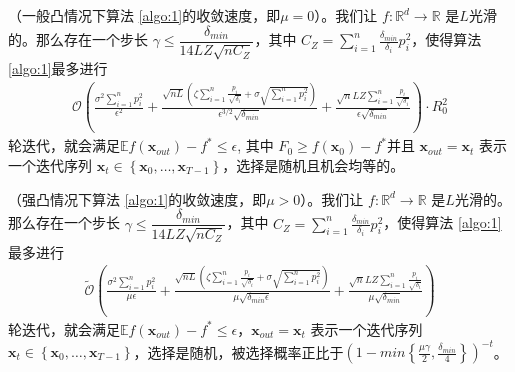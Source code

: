 \begin{theorem}

（一般凸情况下算法 \ref{algo:1}的收敛速度，即$\mu = 0$）。我们让 $f: \mathbb{R}^d \rightarrow \mathbb{R}$ 是$L$光滑的。那么存在一个步长 $\gamma \leq \dfrac{\delta_{min}}{14LZ\sqrt{n C_Z}}$，其中 $C_Z = \sum_{i=1}^n\frac{\delta_{min}}{\delta_i}p_i^2$，使得算法 \ref{algo:1}最多进行
\begin{equation}
\begin{split}
    \mathcal{O}(\frac{\sigma^2\sum_{i=1}^n p_i^2}{\epsilon^2}+\frac{\sqrt{n L}(\zeta\sum_{i=1}^n\frac{p_i}{\sqrt{\delta_i}}+\sigma\sqrt{\sum_{i=1}^n p_i^2})}{\epsilon^{3/2}\sqrt{\delta_{min}} }
    +\frac{\sqrt{n} L Z\sum_{i=1}^n\frac{p_i}{\sqrt{\delta_i}}}{\epsilon\sqrt{\delta_{min}}})\cdot R_0^2 
\end{split}
\label{theorem:2}
\end{equation}
轮迭代，就会满足$\mathbb{E}f(\textbf{x}_{out})-f^* \leq \epsilon $, 其中 $F_0 \geq f(\textbf{x}_0)-f^*$并且 $\textbf{x}_{out} = \textbf{x}_t$ 表示一个迭代序列 $\textbf{x}_t \in \left\{\textbf{x}_0, \ldots, \textbf{x}_{T-1}\right\}$，选择是随机且机会均等的。

\end{theorem}



\begin{theorem}

（强凸情况下算法 \ref{algo:1}的收敛速度，即$\mu > 0$）。我们让 $f: \mathbb{R}^d \rightarrow \mathbb{R}$ 是$L$光滑的。那么存在一个步长 $\gamma \leq \dfrac{\delta_{min}}{14LZ\sqrt{n C_Z}}$，其中 $C_Z = \sum_{i=1}^n\frac{\delta_{min}}{\delta_i}p_i^2$，使得算法 \ref{algo:1}最多进行
\begin{equation}
\begin{split}
    \tilde{\mathcal{O}}(\frac{\sigma^2\sum_{i=1}^n p_i^2}{\mu \epsilon}+\frac{\sqrt{n L}(\zeta\sum_{i=1}^n\frac{p_i}{\sqrt{\delta_i}}+\sigma\sqrt{\sum_{i=1}^n p_i^2})}{\mu \sqrt{\delta_{min} \epsilon}}
    +\frac{\sqrt{n} L Z\sum_{i=1}^n\frac{p_i}{\sqrt{\delta_i}}}{\mu \sqrt{\delta_{min}}})
\end{split}
\label{theorem:3}
\end{equation}
轮迭代，就会满足$\mathbb{E}f(\textbf{x}_{out})-f^* \leq \epsilon $，$\textbf{x}_{out} = \textbf{x}_t$ 表示一个迭代序列 $\textbf{x}_t \in \left\{\textbf{x}_0, \ldots, \textbf{x}_{T-1}\right\}$，选择是随机，被选择概率正比于$(1-min\left\{\frac{\mu \gamma}{2},\frac{\delta_{min}}{4}\right\})^{-t}$。

\end{theorem}

